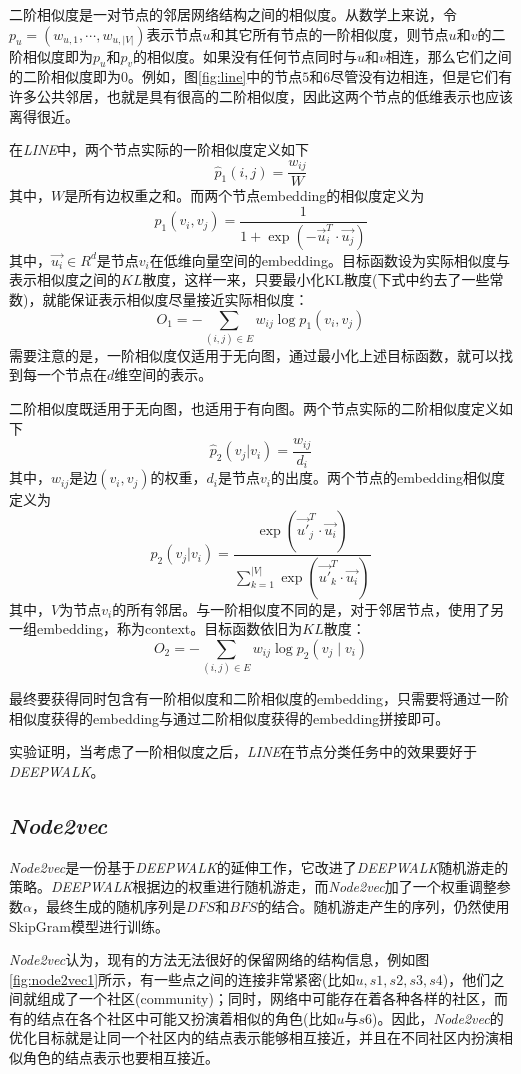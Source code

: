 二阶相似度是一对节点的邻居网络结构之间的相似度。从数学上来说，令$p_u=(w_{u, 1}, \cdots, w_{u,|V|})$表示节点$u$和其它所有节点的一阶相似度，则节点$u$和$v$的二阶相似度即为$p_u$和$p_v$的相似度。如果没有任何节点同时与$u$和$v$相连，那么它们之间的二阶相似度即为0。例如，图\ref{fig:line}中的节点$5$和$6$尽管没有边相连，但是它们有许多公共邻居，也就是具有很高的二阶相似度，因此这两个节点的低维表示也应该离得很近。

在\emph{LINE}中，两个节点实际的一阶相似度定义如下
\[\hat{p}_1(i, j) = \frac{w_{ij}}{W}\]
其中，$W$是所有边权重之和。而两个节点embedding的相似度定义为
\[p_1(v_i, v_j) = \frac{1}{1+ \exp(-\stackrel{\rightarrow}{u}_i^T\cdot \stackrel{\rightarrow}{u_j})}\]
其中，$\stackrel{\rightarrow}{u_i}\in R^d$是节点$v_i$在低维向量空间的embedding。目标函数设为实际相似度与表示相似度之间的$KL$散度，这样一来，只要最小化KL散度(下式中约去了一些常数)，就能保证表示相似度尽量接近实际相似度：
\[O_1 = -\sum_{(i, j)\in E}w_{ij}\log p_1(v_i, v_j)\]
需要注意的是，一阶相似度仅适用于无向图，通过最小化上述目标函数，就可以找到每一个节点在$d$维空间的表示。

二阶相似度既适用于无向图，也适用于有向图。两个节点实际的二阶相似度定义如下
\[\hat{p}_2(v_j|v_i) = \frac{w_{ij}}{d_i}\]
其中，$w_{ij}$是边$(v_i, v_j)$的权重，$d_i$是节点$v_i$的出度。两个节点的embedding相似度定义为
\[p_2(v_j|v_i) = \frac{\exp(\stackrel{\rightarrow}{u'}_j^T\cdot \stackrel{\rightarrow}{u_i})}{\sum_{k=1}^{|V|}\exp(\stackrel{\rightarrow}{u'}_k^T\cdot \stackrel{\rightarrow}{u_i})}\]
其中，$V$为节点$v_i$的所有邻居。与一阶相似度不同的是，对于邻居节点，使用了另一组embedding，称为context。目标函数依旧为$KL$散度：
\[O_2 = -\sum_{(i, j)\in E}w_{ij}\log p_2(v_j\mid v_i)\]

最终要获得同时包含有一阶相似度和二阶相似度的embedding，只需要将通过一阶相似度获得的embedding与通过二阶相似度获得的embedding拼接即可。

实验证明，当考虑了一阶相似度之后，\emph{LINE}在节点分类任务中的效果要好于\emph{DEEPWALK}。

\subsection{\emph{Node2vec}}
\emph{Node2vec}\cite{grover2016node2vec}是一份基于\emph{DEEPWALK}的延伸工作，它改进了\emph{DEEPWALK}随机游走的策略。\emph{DEEPWALK}根据边的权重进行随机游走，而\emph{Node2vec}加了一个权重调整参数$\alpha$，最终生成的随机序列是$DFS$和$BFS$的结合。随机游走产生的序列，仍然使用SkipGram模型进行训练。

\emph{Node2vec}认为，现有的方法无法很好的保留网络的结构信息，例如图\ref{fig:node2vec1}所示，有一些点之间的连接非常紧密(比如$u, s1, s2, s3,s4$)，他们之间就组成了一个社区(community)；同时，网络中可能存在着各种各样的社区，而有的结点在各个社区中可能又扮演着相似的角色(比如$u$与$s6$)。因此，\emph{Node2vec}的优化目标就是让同一个社区内的结点表示能够相互接近，并且在不同社区内扮演相似角色的结点表示也要相互接近。

